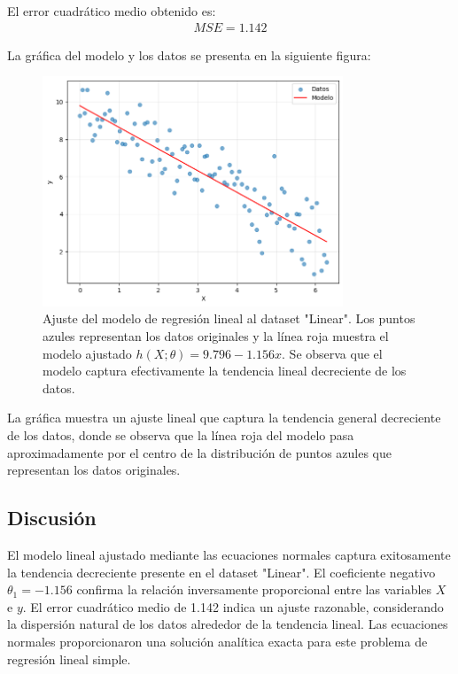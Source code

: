 \documentclass{article}
\begin{document}
El error cuadrático medio obtenido es:
\begin{align}
    MSE = 1.142
\end{align}

La gráfica del modelo y los datos se presenta en la siguiente figura:

\begin{figure}[H]
    \centering
    \includegraphics[width=0.8\textwidth]{images/7_regresion.png}
    \caption{Ajuste del modelo de regresión lineal al dataset "Linear". Los puntos azules representan los datos originales y la línea roja muestra el modelo ajustado $h(X;\theta) = 9.796 - 1.156x$. Se observa que el modelo captura efectivamente la tendencia lineal decreciente de los datos.}
\end{figure}

La gráfica muestra un ajuste lineal que captura la tendencia general decreciente de los datos, donde se observa que la línea roja del modelo pasa aproximadamente por el centro de la distribución de puntos azules que representan los datos originales.

\subsection{Discusión}

El modelo lineal ajustado mediante las ecuaciones normales captura exitosamente la tendencia decreciente presente en el dataset "Linear". El coeficiente negativo $\theta_1 = -1.156$ confirma la relación inversamente proporcional entre las variables $X$ e $y$. El error cuadrático medio de 1.142 indica un ajuste razonable, considerando la dispersión natural de los datos alrededor de la tendencia lineal. Las ecuaciones normales proporcionaron una solución analítica exacta para este problema de regresión lineal simple.
\end{document}
